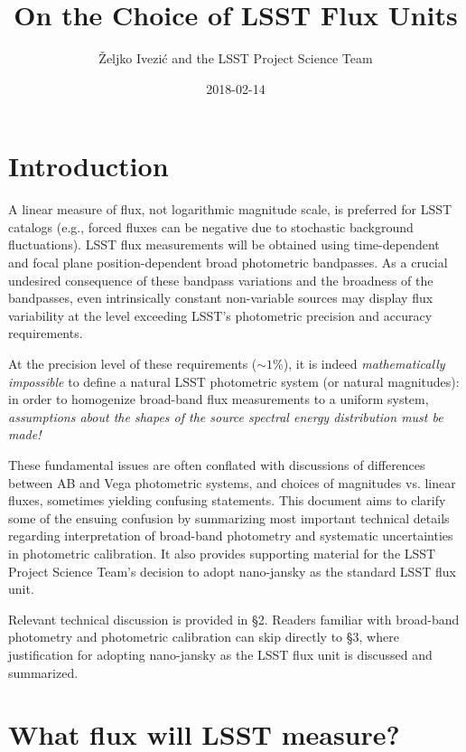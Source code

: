 \documentclass[DM,toc]{lsstdoc}
\title[LSST Flux Units]{On the Choice of LSST Flux Units}
\author{\v{Z}eljko Ivezi\'{c} and the LSST Project Science Team}
\date{2018-02-14}
\begin{document}
\maketitle


\section{Introduction}

A linear measure of flux, not logarithmic magnitude scale, is preferred
for LSST catalogs (e.g., forced fluxes can be negative due to stochastic
background fluctuations). LSST flux measurements will be obtained using
time-dependent and focal plane position-dependent broad photometric
bandpasses. As a crucial undesired consequence of these bandpass variations
and the broadness of the bandpasses, even intrinsically constant non-variable
sources may display flux variability at the level exceeding LSST's photometric precision
and accuracy requirements.

At the precision level of these requirements ($\sim1\%$), it is indeed
\textit{mathematically impossible} to define a natural LSST photometric system (or
natural magnitudes): in order to homogenize broad-band flux measurements
to a uniform system, \textit{assumptions about the shapes of the source spectral
energy distribution must be made!}

These fundamental issues are often conflated with discussions of differences
between AB and Vega photometric systems, and choices of magnitudes vs. linear
fluxes, sometimes yielding confusing statements.  This document aims to clarify
some of the ensuing confusion by summarizing most important technical details
regarding interpretation of broad-band photometry and systematic uncertainties in
photometric calibration. It also provides supporting material for the LSST Project
Science Team's decision to adopt nano-jansky as the standard LSST flux unit.

Relevant technical discussion is provided in \S 2. Readers familiar
with broad-band photometry and photometric calibration can skip
directly to \S 3, where justification for adopting nano-jansky
as the LSST flux unit is discussed and summarized.



\section{What flux will LSST measure?}
\end{document}
